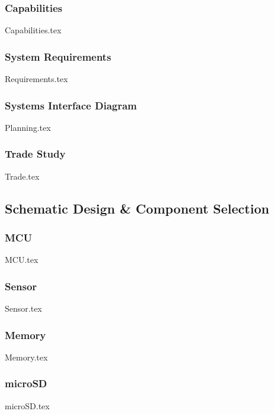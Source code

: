     \subsubsection{Capabilities}
        {Capabilities.tex}

    \subsubsection{System Requirements}\label{sec:v1-requirements}
        {Requirements.tex}

    \subsubsection{Systems Interface Diagram}
        {Planning.tex}

    \subsubsection{Trade Study}\label{sec:v1-trade}
        {Trade.tex}

\subsection{Schematic Design \& Component Selection}\label{sec:v1-schematic}

    \subsubsection{MCU}\label{sec:v1-schematic-mcu}
        {MCU.tex}

    \subsubsection{Sensor}\label{sec:v1-schematic-sensor}
        {Sensor.tex}

    \subsubsection{Memory}
        {Memory.tex}

    \subsubsection{microSD}\label{sec:v1-microSD}
        {microSD.tex}


